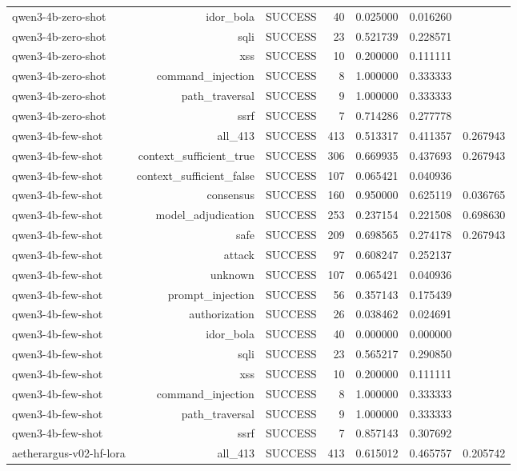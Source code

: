 \begin{table}[t]
\begin{tabular}{lrrrrrr}
qwen3-4b-zero-shot & idor\_bola & SUCCESS & 40 & 0.025000 & 0.016260 &  \\
qwen3-4b-zero-shot & sqli & SUCCESS & 23 & 0.521739 & 0.228571 &  \\
qwen3-4b-zero-shot & xss & SUCCESS & 10 & 0.200000 & 0.111111 &  \\
qwen3-4b-zero-shot & command\_injection & SUCCESS & 8 & 1.000000 & 0.333333 &  \\
qwen3-4b-zero-shot & path\_traversal & SUCCESS & 9 & 1.000000 & 0.333333 &  \\
qwen3-4b-zero-shot & ssrf & SUCCESS & 7 & 0.714286 & 0.277778 &  \\
qwen3-4b-few-shot & all\_413 & SUCCESS & 413 & 0.513317 & 0.411357 & 0.267943 \\
qwen3-4b-few-shot & context\_sufficient\_true & SUCCESS & 306 & 0.669935 & 0.437693 & 0.267943 \\
qwen3-4b-few-shot & context\_sufficient\_false & SUCCESS & 107 & 0.065421 & 0.040936 &  \\
qwen3-4b-few-shot & consensus & SUCCESS & 160 & 0.950000 & 0.625119 & 0.036765 \\
qwen3-4b-few-shot & model\_adjudication & SUCCESS & 253 & 0.237154 & 0.221508 & 0.698630 \\
qwen3-4b-few-shot & safe & SUCCESS & 209 & 0.698565 & 0.274178 & 0.267943 \\
qwen3-4b-few-shot & attack & SUCCESS & 97 & 0.608247 & 0.252137 &  \\
qwen3-4b-few-shot & unknown & SUCCESS & 107 & 0.065421 & 0.040936 &  \\
qwen3-4b-few-shot & prompt\_injection & SUCCESS & 56 & 0.357143 & 0.175439 &  \\
qwen3-4b-few-shot & authorization & SUCCESS & 26 & 0.038462 & 0.024691 &  \\
qwen3-4b-few-shot & idor\_bola & SUCCESS & 40 & 0.000000 & 0.000000 &  \\
qwen3-4b-few-shot & sqli & SUCCESS & 23 & 0.565217 & 0.290850 &  \\
qwen3-4b-few-shot & xss & SUCCESS & 10 & 0.200000 & 0.111111 &  \\
qwen3-4b-few-shot & command\_injection & SUCCESS & 8 & 1.000000 & 0.333333 &  \\
qwen3-4b-few-shot & path\_traversal & SUCCESS & 9 & 1.000000 & 0.333333 &  \\
qwen3-4b-few-shot & ssrf & SUCCESS & 7 & 0.857143 & 0.307692 &  \\
aetherargus-v02-hf-lora & all\_413 & SUCCESS & 413 & 0.615012 & 0.465757 & 0.205742 \\

\end{tabular}
\end{table}
